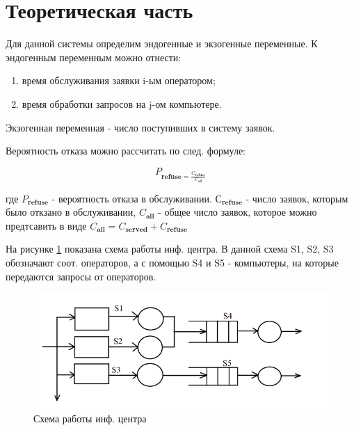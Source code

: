 \section{Теоретическая часть}
Для данной системы определим эндогенные и экзогенные переменные.
К эндогенным переменным можно отнести:
\begin{enumerate}
	\item время обслуживания заявки i-ым оператором;
	\item время обработки запросов на j-ом компьютере.
\end{enumerate}

Экзогенная переменная - число поступивших в систему заявок.

Вероятность отказа можно рассчитать по след. формуле:

\begin{equation}
P_{\textbf{refuse} = \frac{C_{\textbf{refuse}}}{C_{\textbf{all}}}}
\end{equation}

где $P_{\textbf{refuse}}$ - вероятность отказа в обслуживании. $С_{\textbf{refuse}}$ - число заявок, которым было откзано в обслуживании, $C_{\textbf{all}}$ - общее число заявок, которое можно предтсавить в виде $C_{\textbf{all}} = C_{\textbf{served}} + C_{\textbf{refuse}}$

На рисунке \ref{fig:shema1} показана схема работы инф. центра. В данной схема S1, S2, S3 обозначают соот. операторов, а с помощью S4 и S5 - компьютеры, на которые передаются запросы от операторов.

\begin{figure}[h]
	\centering
	\includegraphics[width=0.7\linewidth]{shema1}
	\caption{Схема работы инф. центра}
	\label{fig:shema1}
\end{figure}
